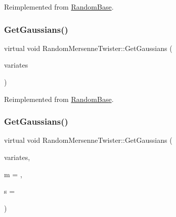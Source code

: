 Reimplemented from \hyperlink{classRandomBase_a5b5c89afe295ba49a5474cdc3bf80c3d}{Random\+Base}.

\hypertarget{classRandomMersenneTwister_a550207d622d23ae8229b0953868bd65d}{}\label{classRandomMersenneTwister_a550207d622d23ae8229b0953868bd65d} 
\subsubsection{\texorpdfstring{Get\+Gaussians()}{GetGaussians()}\hspace{0.1cm}{\footnotesize\ttfamily [1/2]}}
{\footnotesize\ttfamily virtual void Random\+Mersenne\+Twister\+::\+Get\+Gaussians (\begin{DoxyParamCaption}\item[{\hyperlink{classMJArray}{M\+J\+Array} \&}]{variates }\end{DoxyParamCaption})\hspace{0.3cm}{\ttfamily [virtual]}}



Reimplemented from \hyperlink{classRandomBase_aac297a1b64959492831f5e9a1f28c03d}{Random\+Base}.

\hypertarget{classRandomMersenneTwister_a8c76146a5c73d6396f35fd72cbaa1f08}{}\label{classRandomMersenneTwister_a8c76146a5c73d6396f35fd72cbaa1f08} 
\subsubsection{\texorpdfstring{Get\+Gaussians()}{GetGaussians()}\hspace{0.1cm}{\footnotesize\ttfamily [2/2]}}
{\footnotesize\ttfamily virtual void Random\+Mersenne\+Twister\+::\+Get\+Gaussians (\begin{DoxyParamCaption}\item[{std\+::vector$<$ double $>$ \&}]{variates,  }\item[{double}]{m = {},  }\item[{double}]{s = {} }\end{DoxyParamCaption})\hspace{0.3cm}{\ttfamily [virtual]}}



